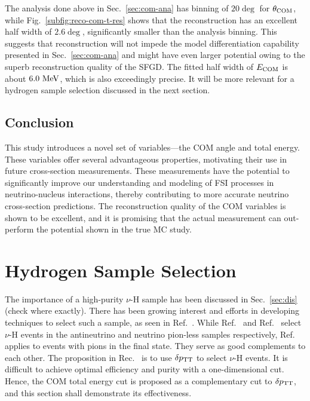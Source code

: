      The analysis done above in Sec.~\ref{sec:com-ana} has binning of $20\deg$ for $\theta_{\textrm{COM}}$, while Fig.~\ref{subfig:reco-com-t-res} shows that the reconstruction has an excellent half width of $2.6\deg$, significantly smaller than the analysis binning.
     This suggests that reconstruction will not impede the model differentiation capability presented in Sec.~\ref{sec:com-ana} and might have even larger potential owing to the superb reconstruction quality of the SFGD.
     The fitted half width of $E_{\textrm{COM}}$ is about $6.0~\textrm{MeV}$, which is also exceedingly precise.
     It will be more relevant for a hydrogen sample selection discussed in the next section. 
 
     \subsection{Conclusion}
     This study introduces a novel set of variables—the COM angle and total energy.
     These variables offer several advantageous properties, motivating their use in future cross-section measurements.
     These measurements have the potential to significantly improve our understanding and modeling of FSI processes in neutrino-nucleus interactions, thereby contributing to more accurate neutrino cross-section predictions.
     The reconstruction quality of the COM variables is shown to be excellent, and it is promising that the actual measurement can out-perform the potential shown in the true MC study.

\section{Hydrogen Sample Selection}
\label{sec:mc-hydrogen}
The importance of a high-purity $\nu$-H sample has been discussed in Sec.~\ref{sec:dis} (check where exactly).
There has been growing interest and efforts in developing techniques to select such a sample, as seen in Ref.~\cite{Lu:2015hea,MINERvA:2023avz,Baudis:2023tma}.
While Ref.~\cite{MINERvA:2023avz} and Ref.~\cite{Baudis:2023tma} select $\nu$-H events in the antineutrino and neutrino pion-less samples respectively, Ref.~\cite{Lu:2015hea} applies to events with pions in the final state. 
They serve as good complements to each other.
The proposition in Rec.~\cite{Lu:2015hea} is to use $\delta p_\textrm{TT}$ to select $\nu$-H events.
It is difficult to achieve optimal efficiency and purity with a one-dimensional cut. 
Hence, the COM total energy cut is proposed as a complementary cut to $\delta p_\textrm{TT}$, and this section shall demonstrate its effectiveness.


